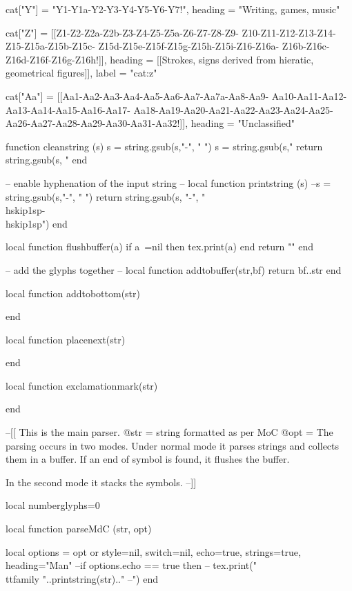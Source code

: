 cat["Y"]   =     {"Y1-Y1a-Y2-Y3-Y4-Y5-Y6-Y7!",
                   heading = "Writing, games, music"}

cat["Z"]   =     {[[Z1-Z2-Z2a-Z2b-Z3-Z4-Z5-Z5a-Z6-Z7-Z8-Z9-
                    Z10-Z11-Z12-Z13-Z14-Z15-Z15a-Z15b-Z15c-
                    Z15d-Z15e-Z15f-Z15g-Z15h-Z15i-Z16-Z16a-
                    Z16b-Z16c-Z16d-Z16f-Z16g-Z16h!]],
                    heading = [[Strokes, signs derived from
                           hieratic, geometrical figures]],
                    label = "cat:z"}

cat["Aa"]  =     {[[Aa1-Aa2-Aa3-Aa4-Aa5-Aa6-Aa7-Aa7a-Aa8-Aa9-
Aa10-Aa11-Aa12-Aa13-Aa14-Aa15-Aa16-Aa17-
Aa18-Aa19-Aa20-Aa21-Aa22-Aa23-Aa24-Aa25-
Aa26-Aa27-Aa28-Aa29-Aa30-Aa31-Aa32!]],
                   heading = "Unclassified"}

function cleanstring (s)
  s = string.gsub(s,"-", " ")
  s = string.gsub(s,"%
  return string.gsub(s, "%
end

-- enable hyphenation of the input string
--
local function printstring (s)
  --s = string.gsub(s,"-", " ")
  return string.gsub(s, "-", "\\hskip1sp-\\hskip1sp")
end

local function flushbuffer(a)
   if a~=nil then tex.print(a) end
   return ""
end

-- add the glyphs together
--
local function addtobuffer(str,bf)
    return bf..str
end

local function addtobottom(str)

end

local function placenext(str)

end

local function exclamationmark(str)

end

--[[
This is the main parser.
@str = string formatted as per MoC
@opt =
The parsing occurs in two modes. Under normal mode
it parses strings and collects them in a buffer. If an
end of symbol is found, it flushes the buffer.

In the second mode it stacks the symbols.
--]]

local numberglyphs=0

local function parseMdC (str, opt)

  local options = opt or {style=nil,
                    switch=nil,
                    echo=true,
                    strings=true,
                    heading="Man"}
  --if options.echo == true then
        -- tex.print("{\\ttfamily "..printstring(str).." --}") end

